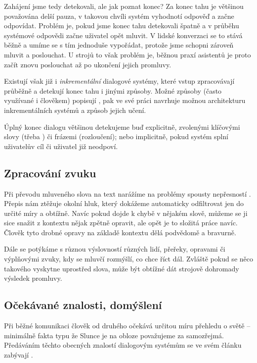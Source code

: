 Zahájení jsme tedy detekovali, ale jak poznat konec? Za konec tahu je
většinou považována delší pauza, v takovou chvíli systém vyhodnotí odpověď
a začne odpovídat. Problém je, pokud jsme konec tahu detekovali špatně a
v průběhu systémové odpovědi začne uživatel opět mluvit. V lidské konverzaci
se to stává běžně a umíme se s tím jednoduše vypořádat, protože jsme schopni
zároveň mluvit a poslouchat. U strojů to však problém je, běžnou praxí asistentů
je proto začít znovu poslouchat až po ukončení jejich promluvy.

Existují však již i \textit{inkrementální} dialogové systémy, které
vstup zpracovávají průběžně a detekují konec tahu i jinými způsoby.
Možné způsoby (často využívané i člověkem) popisují \citet{turn_taking_taxonomy_2015},
\citet{khouzaimi_turn-taking_2016} pak ve své práci navrhuje
možnou architekturu inkrementálních systémů a způsob jejich učení.

Úplný konec dialogu většinou detekujeme buď explicitně, zvolenými klíčovými
slovy (třeba ) či frázemi (rozloučení); nebo implicitně, pokud
systém splní uživatelův cíl či uživatel již neodpoví.

\subsection{Zpracování zvuku}

Při převodu mluveného slova na text narážíme na problémy spousty nepřesností \citep[sekce 4.1]{glass_challenges_1999}.
Přepis nám ztěžuje okolní hluk, který dokážeme automaticky odfiltrovat jen do určité míry
a obtížně. Navíc pokud dojde k chybě v nějakém slově, můžeme se ji sice snažit
z kontextu nějak zpětně opravit, ale opět je to složitá práce navíc. Člověk
tyto drobné opravy na základě kontextu dělá podvědomě a bravurně.

Dále se potýkáme s různou výslovností různých lidí, přeřeky, opravami
či výplňovými zvuky, kdy se mluvčí rozmýšlí, co chce říct dál. Zvláště
pokud se něco takového vyskytne uprostřed slova, může být obtížné dát
strojově dohromady výsledek promluvy.

\subsection{Očekávané znalosti, domýšlení}

Při běžné komunikaci člověk od druhého očekává určitou míru přehledu o světě
-- minimálně fakta typu že Slunce je na obloze považujeme za samozřejmá.
Předáváním těchto obecných znalostí dialogovým systémům se ve svém článku
zabývají \citet{young_augmenting_2018}.

